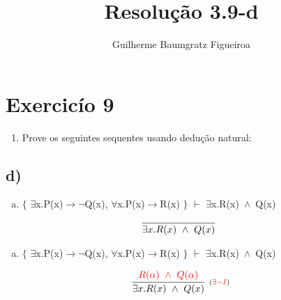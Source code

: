 \documentclass[aspectratio=43]{beamer}
\title[\sc{Resolu\c c\~ao}]{Resolu\c c\~ao 3.9-d}
\author[Guilherme Baumgratz Figueiroa]{Guilherme Baumgratz Figueiroa}
\institute[UFOP]{Universidade Federal de Ouro Preto} %
\date{}
\newcommand{\ria}{$\rightarrow$}
\newcommand{\fall}{$\forall$}
\newcommand{\ex}{$\exists$}
\newcommand{\nao}{$\neg$}
\newcommand{\andd}{$\wedge$}
\begin{document}
	
	\begin{frame}
		\titlepage
	\end{frame}
	
	\section{Exercic\'io 9}
	
	\begin{frame}%
    
    	\begin{enumerate}[1.]
			\item Prove os seguintes sequentes usando dedu\c c\~ao natural: \\
		\end{enumerate}
				
	\end{frame}
    \subsection{d)}
    
    \begin{frame}[fragile]
    
    	\begin{enumerate}[d)]
			\item $\{$ \ex x.P(x)\ria \nao Q(x), \fall x.P(x)\ria R(x) $\}$ $\vdash$ \ex x.R(x)\ \andd\ Q(x) \\
		\end{enumerate}
        
        \vspace{80pt}
        
        \[
        \begin{array}{c}
		
        	\infer[_{}]
            	{\exists  x. R(x)\ \land\ Q(x)}
            	{}
        
		\end{array}
        \]
        
	\end{frame}
    
    \begin{frame}[fragile]
    
    	\begin{enumerate}[d)]
			\item $\{$ \ex x.P(x)\ria \nao Q(x), \fall x.P(x)\ria R(x) $\}$ $\vdash$ \ex x.R(x)\ \andd\ Q(x) \\
		\end{enumerate}
        
        \vspace{80pt}
        
        \[
        \begin{array}{c}
		
        	\infer[_{(\textcolor{red}{\exists -I})}]
            	{\exists  x. R(x)\ \land\ Q(x)}
            	{\textcolor{red}{R(\alpha)\ \land\ Q(\alpha)}}
        
		\end{array}
        \]
        
	\end{frame}
    
\end{document}
